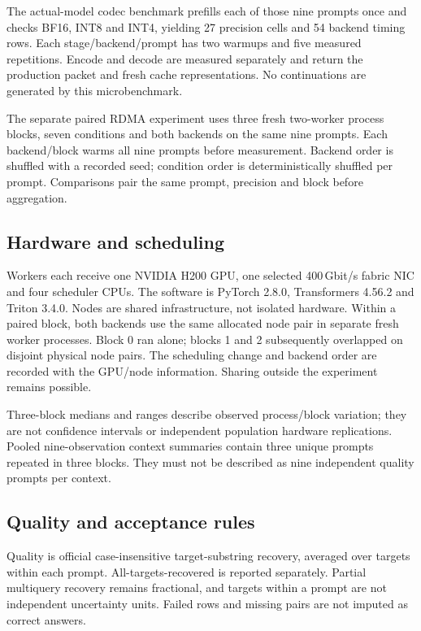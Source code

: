 \documentclass[10pt,twocolumn,letterpaper]{article}
\begin{document}
The actual-model codec benchmark prefills each of those nine prompts once and
checks BF16, INT8 and INT4, yielding 27 precision cells and 54 backend timing
rows. Each stage/backend/prompt has two warmups and five measured repetitions.
Encode and decode are measured separately and return the production packet
and fresh cache representations. No continuations are generated by this
microbenchmark.

The separate paired RDMA experiment uses three fresh two-worker process blocks,
seven conditions and both backends on the same nine prompts. Each backend/block
warms all nine prompts before measurement. Backend order is shuffled with a
recorded seed; condition order is deterministically shuffled per prompt.
Comparisons pair the same prompt, precision and block before aggregation.

\subsection{Hardware and scheduling}
Workers each receive one NVIDIA H200 GPU, one selected 400\,Gbit/s fabric NIC
and four scheduler CPUs. The software is PyTorch 2.8.0, Transformers 4.56.2 and
Triton 3.4.0. Nodes are shared infrastructure, not isolated hardware. Within a
paired block, both backends use the same allocated node pair in separate fresh
worker processes. Block 0 ran alone; blocks 1 and 2 subsequently overlapped
on disjoint physical node pairs. The scheduling change and backend order are
recorded with the GPU/node information. Sharing outside the experiment remains
possible.

Three-block medians and ranges describe observed process/block variation; they
are not confidence intervals or independent population hardware replications.
Pooled nine-observation context summaries contain three unique prompts repeated
in three blocks. They must not be described as nine independent quality
prompts per context.

\subsection{Quality and acceptance rules}
Quality is official case-insensitive target-substring recovery, averaged over
targets within each prompt. All-targets-recovered is reported separately.
Partial multiquery recovery remains fractional, and targets within a prompt
are not independent uncertainty units. Failed rows and missing pairs are not
imputed as correct answers.
\end{document}
